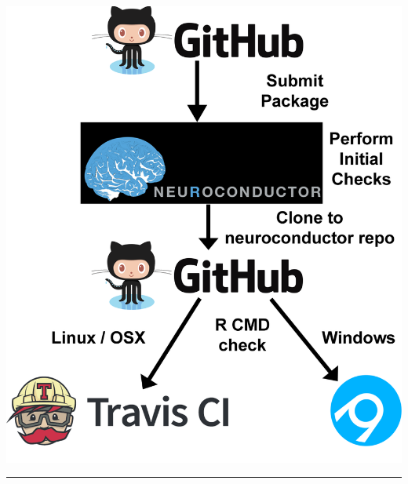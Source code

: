 \documentclass[final]{beamer}\usepackage[]{graphicx}\usepackage[]{color}
\begin{document}
\begin{frame}[fragile]
\begin{table}[!htb]
\begin{minipage}{0.36\linewidth}
\begin{center}
\includegraphics[width=0.6\linewidth]{neuroc_workflow.png}
\end{center}

\noindent\rule{\linewidth}{5pt}



\end{minipage}
\end{table}
\end{frame}
\end{document}
